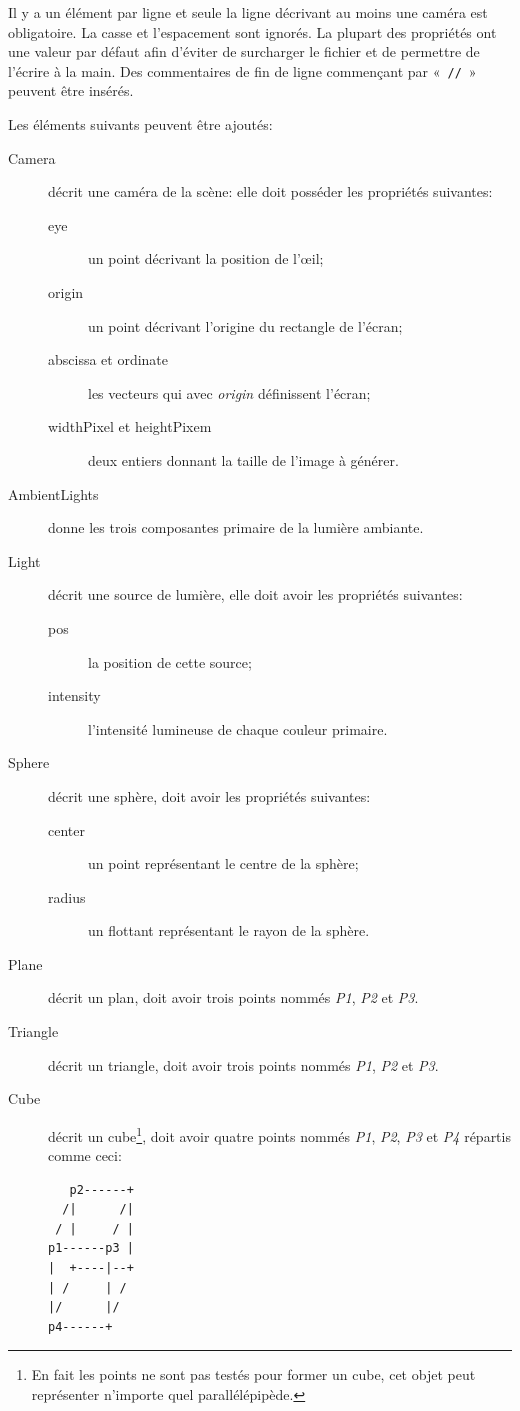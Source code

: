 \documentclass[a4paper]{article}
\begin{document}
    Il y a un élément par ligne et seule la ligne décrivant au moins une caméra
    est obligatoire. La casse et l'espacement sont ignorés. La plupart des
    propriétés ont une valeur par défaut afin d'éviter de surcharger le
    fichier et de permettre de l'écrire à la main. Des commentaires de fin de
    ligne commençant par «~\verb+//+~» peuvent être insérés.

    Les éléments suivants peuvent être ajoutés:
    \begin{description}
      \item[Camera] décrit une caméra de la scène: elle doit posséder les
        propriétés suivantes:
        \begin{description}
          \item[eye] un point décrivant la position de l'œil;
          \item[origin] un point décrivant l'origine du rectangle de l'écran;
          \item[abscissa et ordinate] les vecteurs qui avec \textit{origin}
            définissent l'écran;
          \item[widthPixel et heightPixem] deux entiers donnant la taille de
            l'image à générer. 
        \end{description}
      \item[AmbientLights] donne les trois composantes primaire de la lumière
        ambiante.
      \item[Light] décrit une source de lumière, elle doit avoir les propriétés
        suivantes:
        \begin{description}
          \item[pos] la position de cette source;
          \item[intensity] l'intensité lumineuse de chaque couleur primaire.
        \end{description}
      \item[Sphere] décrit une sphère, doit avoir les propriétés suivantes:
        \begin{description}
          \item[center] un point représentant le centre de la sphère;
          \item[radius] un flottant représentant le rayon de la sphère.
        \end{description}
      \item[Plane] décrit un plan, doit avoir trois points nommés \textit{P1},
        \textit{P2} et \textit{P3}.
      \item[Triangle] décrit un triangle, doit avoir trois points nommés
        \textit{P1}, \textit{P2} et \textit{P3}.
      \item[Cube] décrit un cube\footnote{En fait les points ne sont pas testés
        pour former un cube, cet objet peut représenter n'importe quel
        parallélépipède.}, doit avoir quatre points nommés
        \textit{P1}, \textit{P2}, \textit{P3} et \textit{P4} répartis comme
        ceci: \begin{lstlisting}
   p2------+
  /|      /|
 / |     / |
p1------p3 |
|  +----|--+
| /     | /
|/      |/
p4------+
        \end{lstlisting}
    \end{description}
\end{document}
